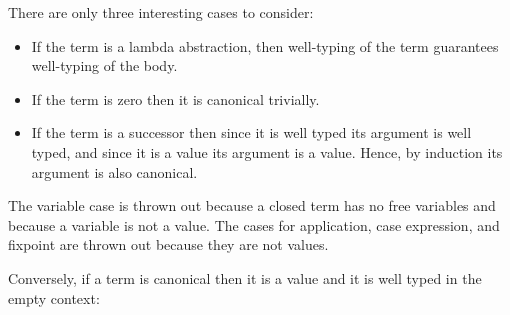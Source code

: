 There are only three interesting cases to consider:

\begin{itemize}
\item
  If the term is a lambda abstraction, then well-typing of the term
  guarantees well-typing of the body.
\item
  If the term is zero then it is canonical trivially.
\item
  If the term is a successor then since it is well typed its argument is
  well typed, and since it is a value its argument is a value. Hence, by
  induction its argument is also canonical.
\end{itemize}

The variable case is thrown out because a closed term has no free
variables and because a variable is not a value. The cases for
application, case expression, and fixpoint are thrown out because they
are not values.

Conversely, if a term is canonical then it is a value and it is well
typed in the empty context:

